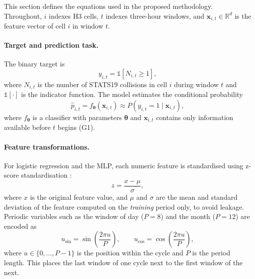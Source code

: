 This section defines the equations used in the proposed methodology. Throughout, $i$ indexes H3 cells, $t$ indexes three-hour windows, and $\mathbf{x}_{i,t}\in\mathbb{R}^{d}$ is the feature vector of cell $i$ in window $t$.

\paragraph{Target and prediction task.}
The binary target is
\begin{equation}
y_{i,t} = \mathbb{1}\left[N_{i,t} \geq 1\right],
\label{eq:target}
\end{equation}
where $N_{i,t}$ is the number of STATS19 collisions in cell $i$ during window $t$ and $\mathbb{1}[\cdot]$ is the indicator function. The model estimates the conditional probability
\begin{equation}
\hat{p}_{i,t} = f_{\bm{\theta}}(\mathbf{x}_{i,t}) \approx P\left(y_{i,t}=1 \mid \mathbf{x}_{i,t}\right),
\label{eq:task}
\end{equation}
where $f_{\bm{\theta}}$ is a classifier with parameters $\bm{\theta}$ and $\mathbf{x}_{i,t}$ contains only information available before $t$ begins (G1).

\paragraph{Feature transformations.}
For logistic regression and the MLP, each numeric feature is standardised using z-score standardisation \cite{hastie2009elements}:
\begin{equation}
z = \frac{x - \mu}{\sigma},
\label{eq:zscore}
\end{equation}
where $x$ is the original feature value, and $\mu$ and $\sigma$ are the mean and standard deviation of the feature computed on the \emph{training} period only, to avoid leakage. Periodic variables such as the window of day ($P=8$) and the month ($P=12$) are encoded as
\begin{equation}
u_{\sin} = \sin\!\left(\frac{2\pi u}{P}\right), \qquad
u_{\cos} = \cos\!\left(\frac{2\pi u}{P}\right),
\label{eq:cyclic}
\end{equation}
where $u \in \{0,\dots,P-1\}$ is the position within the cycle and $P$ is the period length. This places the last window of one cycle next to the first window of the next.

